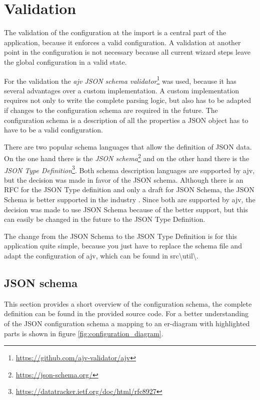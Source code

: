 \section{Validation}
\label{sec:validation}

The validation of the configuration at the import is a central part of the application, because it enforces a valid configuration. A validation at another point in the configuration is not necessary because all current wizard steps leave the global configuration in a valid state.

For the validation the \textit{ajv JSON schema validator}\footnote{\url{https://github.com/ajv-validator/ajv}} was used, because it has several advantages over a custom implementation. A custom implementation requires not only to write the complete parsing logic, but also has to be adapted if changes to the configuration schema are required in the future. The configuration schema is a description of all the properties a JSON object has to have to be a valid configuration.

There are two popular schema languages that allow the definition of JSON data. On the one hand there is the \textit{JSON schema}\footnote{\url{https://json-schema.org/}} and on the other hand there is the \textit{JSON Type Definition}\footnote{\url{https://datatracker.ietf.org/doc/html/rfc8927}}. Both schema description languages are supported by ajv, but the decision was made in favor of the JSON schema. Although there is an RFC for the JSON Type definition and only a draft for JSON Schema, the JSON Schema is better supported in the industry \cite{ajv_comparison}. Since both are supported by ajv, the decision was made to use JSON Schema because of the better support, but this can easily be changed in the future to the JSON Type Definition.

The change from the JSON Schema to the JSON Type Definition is for this application quite simple, because you just have to replace the schema file and adapt the configuration of ajv, which can be found in src\textbackslash util\textbackslash .

\subsection{JSON schema}
This section provides a short overview of the configuration schema, the complete definition can be found in the provided source code. For a better understanding of the JSON configuration schema a mapping to an er-diagram with highlighted parts is shown in figure \ref{fig:configuration_diagram}.

